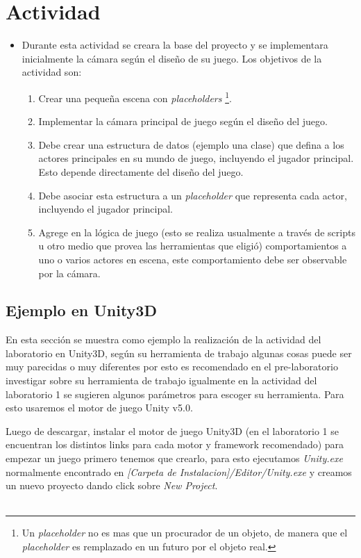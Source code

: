 \section{Actividad}
\begin{itemize}
\item Durante esta actividad se creara la base del proyecto y se implementara inicialmente la cámara según el diseño de su juego. Los objetivos de la actividad son:
\begin{enumerate}
  \item Crear una pequeña escena con \emph{placeholders} \footnote{Un \emph{placeholder} no es mas que un procurador de un objeto, de manera que el \emph{placeholder} es remplazado en un futuro por el objeto real.}.
  \item Implementar la cámara principal de juego según el diseño del juego.
  \item Debe crear una estructura de datos (ejemplo una clase) que defina a los actores principales en su mundo de juego, incluyendo el jugador principal. Esto depende directamente del diseño del juego.
  \item Debe asociar esta estructura a un \emph{placeholder} que representa cada actor, incluyendo el jugador principal.
  \item Agrege en la lógica de juego (esto se realiza usualmente a través de scripts u otro medio que provea las herramientas que eligió) comportamientos a uno o varios actores en escena, este comportamiento debe ser observable por la cámara.
\end{enumerate}
\end{itemize}

\subsection{Ejemplo en Unity3D}
En esta sección se muestra como ejemplo la realización de la actividad del laboratorio en Unity3D, según su herramienta de trabajo algunas cosas puede ser muy parecidas o muy diferentes por esto es recomendado en el pre-laboratorio investigar sobre su herramienta de trabajo igualmente en la actividad del laboratorio 1 se sugieren algunos parámetros para escoger su herramienta. Para esto usaremos el motor de juego Unity v5.0.

Luego de descargar, instalar el motor de juego Unity3D (en el laboratorio 1 se encuentran los distintos links para cada motor y framework recomendado) para empezar un juego primero tenemos que crearlo, para esto ejecutamos \emph{Unity.exe} normalmente encontrado en \emph{[Carpeta de Instalacion]/Editor/Unity.exe} y creamos un nuevo proyecto dando click sobre \emph{New Project}.\\~

